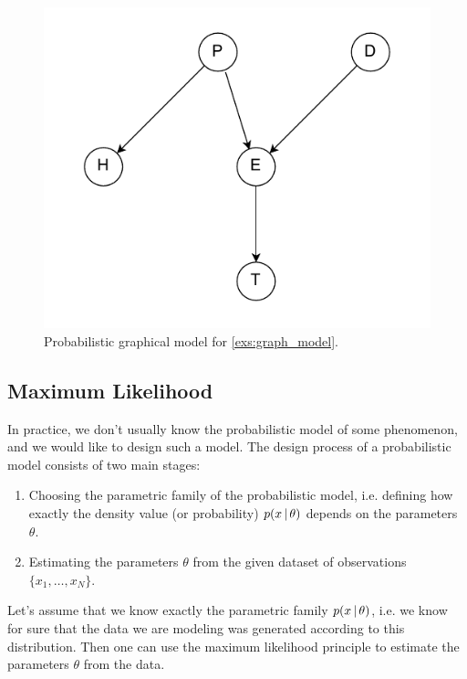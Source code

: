 \begin{figure}[t]
    \centering
    \includegraphics[width=0.4\linewidth]{pics/graphical_model.pdf}
    \caption{Probabilistic graphical model for \cref{exs:graph_model}.}
    \label{fig:graphical_model}
\end{figure}

\subsection{Maximum Likelihood}

In practice, we don't usually know the probabilistic model of some phenomenon, and we would like to design such a model.
The design process of a probabilistic model consists of two main stages:
\begin{enumerate}
    \item Choosing the parametric family of the probabilistic model, i.e. defining how exactly the density value (or probability) $p(x\,|\, \theta)$ depends on the parameters $\theta$.
    \item Estimating the parameters $\theta$ from the given dataset of observations $\{x_1,\ldots, x_N\}$.
\end{enumerate}

Let's assume that we know exactly the parametric family $p(x\,|\, \theta)$, i.e. we know for sure that the data we are modeling was generated according to this distribution.
Then one can use the maximum likelihood principle to estimate the parameters $\theta$ from the data.

